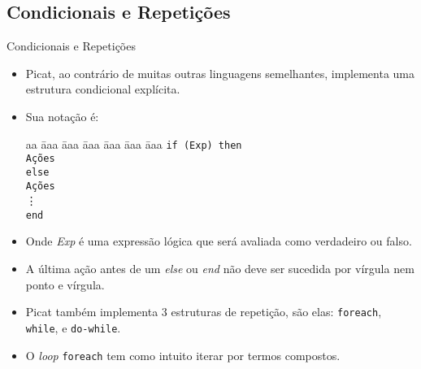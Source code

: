 
\subsection{Condicionais e Repetições}
\begin{frame}{Condicionais e Repetições}
    
    \begin{itemize}
        
        \item Picat, ao contrário de muitas outras linguagens semelhantes, implementa uma
        estrutura condicional explícita.
        
        \item Sua notação é:\\
        
        \begin{tabbing}
            aa \= aaa \= aaa \= aaa \= aaa \= aaa \= aaa \kill
            \> \texttt{if (Exp) then}\\
            \> \> \texttt{Ações} \\
            \> \texttt{else}\\
            \> \> \texttt{Ações}\\
            \> \vdots\\
            \> \texttt{end} 
        \end{tabbing}
        
        \item Onde \emph{Exp} é uma expressão lógica que será avaliada como verdadeiro ou
        falso.
        
        \item A última ação antes de um \emph{else} ou \emph{end} não deve ser sucedida por
        vírgula nem ponto e vírgula.
        
    \end{itemize}
    
    \framebreak
    
    \begin{itemize}
        
        \item Picat também implementa 3 estruturas de repetição, são elas:
        \texttt{foreach}, \texttt{while}, e \texttt{do-while}.
        
        \item O \textit{loop} \texttt{foreach} tem como intuito iterar por termos compostos.
        

\end{itemize}
\end{frame}
